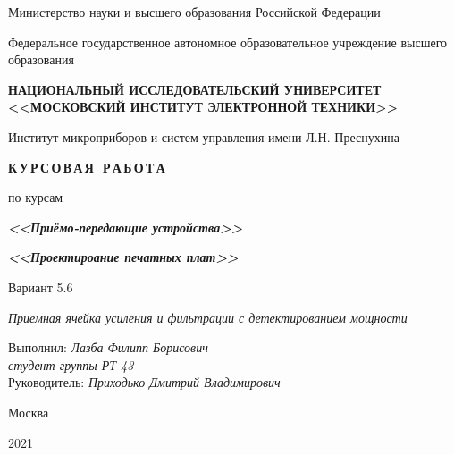\thispagestyle{empty}
\setcounter{page}{0}

\begin{center}
    Министерство науки  и высшего образования Российской Федерации

    \vspace{1ex}

    Федеральное государственное автономное образовательное учреждение высшего образования

    \textbf{НАЦИОНАЛЬНЫЙ ИССЛЕДОВАТЕЛЬСКИЙ УНИВЕРСИТЕТ <<МОСКОВСКИЙ ИНСТИТУТ ЭЛЕКТРОННОЙ ТЕХНИКИ>>}

    \vspace{1ex}

    Институт микроприборов и систем управления имени Л.Н. Преснухина
\end{center}

\vspace{13ex}

\begin{center}
    \textbf{К\,У\,Р\,С\,О\,В\,А\,Я\,\, Р\,А\,Б\,О\,Т\,А}
    \vspace{1ex}

    по курсам

    \textbf{\textit{<<Приёмо-передающие устройства>>}}
    
    \textbf{\textit{<<Проектироание печатных плат>>}}
    
    Вариант 5.6
    
    \textit{Приемная ячейка усиления и фильтрации с детектированием мощности}

\end{center}

\vspace{20ex}

\begin{flushright}
    \noindent
    Выполнил: \textit{Лазба Филипп Борисович} \\
    \textit{студент группы РТ-43} \\
    Руководитель: \textit{Приходько Дмитрий Владимирович}
\end{flushright}

\vfill

\begin{center}
    Москва

    2021
\end{center}

\newpage
